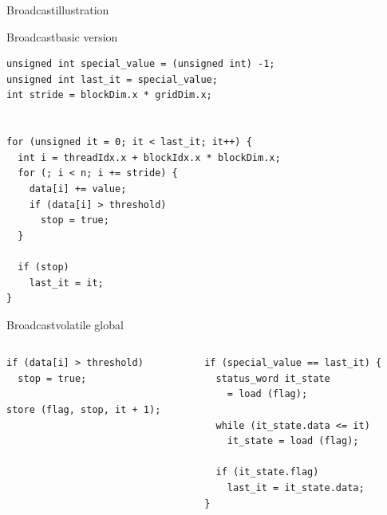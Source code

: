 \documentclass[aspectratio=169,compress]{beamer}
\begin{document}
\begin{frame}[fragile]{Broadcast}{illustration}
	\centering
	\begin{figure}
		\centering
	\end{figure}
\end{frame}

\begin{frame}[fragile]{Broadcast}{basic version}
\centering
\begin{lstlisting}[showstringspaces=false]
unsigned int special_value = (unsigned int) -1;
unsigned int last_it = special_value;
int stride = blockDim.x * gridDim.x;


for (unsigned it = 0; it < last_it; it++) {
  int i = threadIdx.x + blockIdx.x * blockDim.x;
  for (; i < n; i += stride) {
    data[i] += value;
    if (data[i] > threshold)
      stop = true;
  }

  if (stop)
    last_it = it;
}
\end{lstlisting}
\end{frame}

\begin{frame}[fragile]{Broadcast}{volatile global}
	\begin{columns}
			\begin{column}{0.4\textwidth}
\begin{lstlisting}[title={sensor owner}]
if (data[i] > threshold)
  stop = true;

store (flag, stop, it + 1);
\end{lstlisting}
			\end{column}
			\begin{column}{0.4\textwidth}
\begin{lstlisting}[title={other threads}]
if (special_value == last_it) {
  status_word it_state 
    = load (flag);

  while (it_state.data <= it)
    it_state = load (flag);

  if (it_state.flag)
    last_it = it_state.data;
}
\end{lstlisting}
			\end{column}
	\end{columns}
\end{frame}
\end{document}
